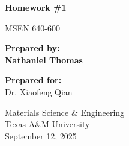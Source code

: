 \thispagestyle{empty}

\begin{titlepage}
  \begin{center}
    \vspace*{2cm}

    \Huge
    \textbf{Homework \#1}

    \vspace{0.8cm}

    \LARGE
    MSEN 640-600

    \vspace{2cm}

    \Large
    \textbf{Prepared by:}\\[0.5cm]
    \huge
    \textbf{Nathaniel Thomas}

    \vspace{1cm}

    \Large
    \textbf{Prepared for:}\\[0.5cm]
    \large
    Dr. Xiaofeng Qian

    \vfill

    

    \vspace{1cm}

    \Large
    Materials Science \& Engineering\\
    Texas A\&M University\\
    \vspace{0.5cm}
    \large
    September 12, 2025

  \end{center}
\end{titlepage}
